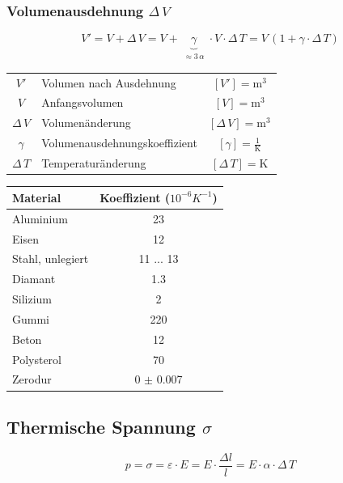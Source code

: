 \subsubsection{Volumenausdehnung $\Delta \, V $}

$$ \boxed{ V' = V + \Delta \,  V = V + \underbrace{  \gamma }_{\substack{\approx 3 \, \alpha}}  \cdot V \cdot \Delta \, T = V \, (1 + \gamma \cdot \Delta \, T ) }$$


\begin{tabular}{c l c}
		$V'$ & Volumen nach Ausdehnung & $[V'] = \mathrm{m^3}$ \\
		$V$ & Anfangsvolumen & $[V] = \mathrm{m^3}$ \\
		$\Delta \, V$ & Volumenänderung & $[\Delta \, V] = \mathrm{m^3}$ \\
		\rule{0pt}{8pt}$\gamma$ & Volumenausdehnungskoeffizient & $[\gamma] = \mathrm{\frac{1}{K}}$ \\ 
		$\Delta \, T $ & Temperaturänderung & $[\Delta \, T ] = \mathrm{K}$ \\
\end{tabular}


\begin{center}
    \begin{tabular}{lc}
        \textbf{Material} & \textbf{Koeffizient ($10^{-6} K^{-1} $)}\\ \hline
		Aluminium       & 23 \\
		Eisen           & 12 \\
		Stahl, unlegiert& 11 ... 13 \\
		Diamant         & 1.3 \\
		Silizium        & 2 \\
		Gummi           & 220 \\
		Beton           & 12 \\
		Polysterol      & 70 \\
		Zerodur         & 0 $\pm$ 0.007 \\
	\end{tabular}
\end{center}




\subsection{Thermische Spannung $\sigma$}


$$\boxed{  p = \sigma = \varepsilon \cdot E = E \cdot \frac{\Delta l}{l} =  E \cdot \alpha \cdot \Delta \, T } $$

